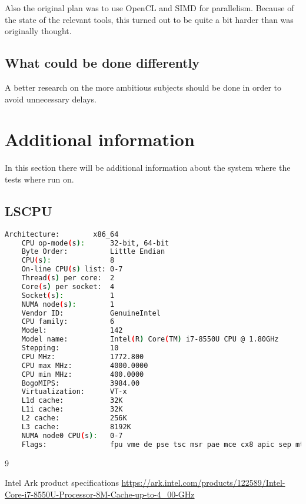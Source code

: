 \documentclass[a4paper]{article}
\begin{document}
Also the original plan was to use OpenCL and SIMD for parallelism. Because of the state of the relevant tools, this turned out to be quite a bit harder than was originally thought.
\subsection{What could be done differently}
A better research on the more ambitious subjects should be done in order to avoid unnecessary delays.

\section{Additional information}
In this section there will be additional information about the system where the tests where run on.
\subsection{LSCPU}
\begin{lstlisting}[language=bash]
	Architecture:        x86_64
	CPU op-mode(s):      32-bit, 64-bit
	Byte Order:          Little Endian
	CPU(s):              8
	On-line CPU(s) list: 0-7
	Thread(s) per core:  2
	Core(s) per socket:  4
	Socket(s):           1
	NUMA node(s):        1
	Vendor ID:           GenuineIntel
	CPU family:          6
	Model:               142
	Model name:          Intel(R) Core(TM) i7-8550U CPU @ 1.80GHz
	Stepping:            10
	CPU MHz:             1772.800
	CPU max MHz:         4000.0000
	CPU min MHz:         400.0000
	BogoMIPS:            3984.00
	Virtualization:      VT-x
	L1d cache:           32K
	L1i cache:           32K
	L2 cache:            256K
	L3 cache:            8192K
	NUMA node0 CPU(s):   0-7
	Flags:               fpu vme de pse tsc msr pae mce cx8 apic sep mtrr pge mca cmov pat pse36 clflush dts acpi mmx fxsr sse sse2 ss ht tm pbe syscall nx pdpe1gb rdtscp lm constant_tsc art arch_perfmon pebs bts rep_good nopl xtopology nonstop_tsc cpuid aperfmperf tsc_known_freq pni pclmulqdq dtes64 monitor ds_cpl vmx est tm2 ssse3 sdbg fma cx16 xtpr pdcm pcid sse4_1 sse4_2 x2apic movbe popcnt tsc_deadline_timer aes xsave avx f16c rdrand lahf_lm abm 3dnowprefetch cpuid_fault epb invpcid_single pti tpr_shadow vnmi flexpriority ept vpid fsgsbase tsc_adjust bmi1 avx2 smep bmi2 erms invpcid mpx rdseed adx smap clflushopt intel_pt xsaveopt xsavec xgetbv1 xsaves ibpb ibrs stibp dtherm ida arat pln pts hwp hwp_notify hwp_act_window hwp_epp
\end{lstlisting}
\begin{thebibliography}{9}

	Intel
	Ark product specifications
	\url{https://ark.intel.com/products/122589/Intel-Core-i7-8550U-Processor-8M-Cache-up-to-4_00-GHz}
	
\end{thebibliography}
\end{document}
